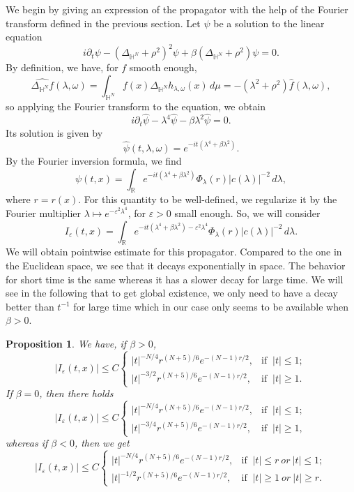 \documentclass[10pt,leqno]{amsart}
\newtheorem{prop}{Proposition}[section]
\numberwithin{equation}{section}
\newcommand{\field}[1]{\mathbb{#1}}
\newcommand{\R}{\field{R}}          		%
\newcommand{\Hy}{\field{H}}
\begin{document}
 We begin by giving an expression of the propagator with the help of the Fourier transform defined in the previous section. Let $\psi$ be a solution to the linear equation
$$i\partial_t \psi - (\Delta_{\Hy^N}+\rho^2)^2 \psi +\beta (\Delta_{\Hy^N} +\rho^2) \psi =0.$$
By definition, we have, for $f$ smooth enough,
$$\widehat{\Delta_{\Hy^N} f} (\lambda ,\omega)=\int_{\Hy^N} f(x) \Delta_{\Hy^N} h_{\lambda ,\omega} (x)\, d\mu =-(\lambda^2 +\rho^2) \hat{f} (\lambda ,\omega),$$
so applying the Fourier transform to the equation, we obtain
$$i\partial_t \hat{\psi}- \lambda^4 \hat{\psi} - \beta \lambda^2 \hat{\psi} =0 . $$
Its solution is given by
\[
\hat{\psi}(t,\lambda,\omega)=e^{-it\left(\lambda^4+\beta \lambda^2\right)}.
\]
By the Fourier inversion formula, we find
$$\psi(t,x)=\int_{\R}  e^{-it (\lambda^4 +\beta \lambda^2 ) } \Phi_\lambda (r) |c(\lambda)|^{-2}\, d\lambda,  $$
where $r=r(x)$.
For this quantity to be well-defined, we regularize it by
the Fourier multiplier $\lambda\mapsto e^{-\varepsilon^2\lambda^4}$, for $\varepsilon>0$ small enough. So, we will consider 
$$I_\varepsilon (t,x) =\int_{\R}  e^{-it (\lambda^4 +\beta \lambda^2 )-\varepsilon^2 \lambda^4 } \Phi_\lambda (r) |c(\lambda)|^{-2}\, d\lambda. $$
We will obtain pointwise estimate for this propagator. Compared to the one in the Euclidean space, we see that it decays exponentially in space. The behavior for short time is the same whereas it has a slower decay for large time. We will see in the following that to get global existence, we only need to have a decay better than $t^{-1}$ for large time which in our case only seems to be available when $\beta>0$. 

\begin{prop}
\label{propestv}
We have, if $\beta>0$,
$$|I_\varepsilon(t,x)|\leq C \begin{cases}|t|^{-N/4} r^{(N+5)/6} e^{-(N-1)r/2},&\mbox{if }\ |t|\leq 1; \\ |t|^{-3/2}  r^{(N+5)/6} e^{-(N-1)r/2},&\mbox{if }\ |t|\geq 1. \end{cases}$$
If $\beta =0$, then there holds
$$|I_\varepsilon(t,x)|\leq C \begin{cases}|t|^{-N/4} r^{(N+5)/6} e^{-(N-1)r/2},&\mbox{if }\ |t|\leq 1; \\ |t|^{-3/4}  r^{(N+5)/6} e^{-(N-1)r/2},&\mbox{if }\ |t|\geq 1, \end{cases}$$
whereas if $\beta<0$, then we get 
$$|I_\varepsilon(t,x)|\leq C \begin{cases}|t|^{-N/4} r^{(N+5)/6} e^{-(N-1)r/2},&\mbox{if }\ |t|\leq r \ or\ |t|\leq 1; \\ |t|^{-1/2}  r^{(N+5)/6} e^{-(N-1)r/2},&\mbox{if }\ |t|\geq 1\ or\ |t|\geq r. \end{cases}$$
\end{prop}
\end{document}

